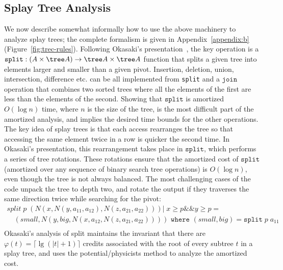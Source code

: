 \subsection{Splay Tree Analysis}
We now describe somewhat informally how to use the above machinery to
analyze splay trees; the complete formalism is given 
in Appendix~\ref{appendix:b} (Figure~\ref{fig:trec-rules}).%
Following 
Okasaki's presentation~\cite{okasaki:purely-functional-data-structures},
the key operation is
a $\texttt{split} : (A \times \tree A) \to \tree A \times \tree A$ function that splits a given tree into elements larger and smaller than a given pivot. Insertion, deletion, union, intersection, difference etc. can be all implemented from \texttt{split} and a $\texttt{join}$ operation that combines two sorted trees where all the elements of the first are less than the elements of the second. Showing that $\texttt{split}$ is amortized $O(\log n)$ time, where $n$ is the size of the tree, is the most difficult part of the amortized analysis, and implies the desired time bounds for the other operations.  The key idea of splay trees is that each access rearranges the tree so that accessing the same element twice in a row is quicker the second time. In Okasaki's presentation, this rearrangement takes place in $\texttt{split}$, which performs a series of tree rotations. These rotations ensure that the amortized cost of $\texttt{split}$ (amortized over any sequence of binary search tree operations) is $O(\log n)$, even though the tree is not always balanced.
The most challenging cases of the code unpack the tree to depth two, and rotate the output if they traverses the same direction twice while searching for the pivot:
$$
\begin{array}{l}
split \; p \; (N (x,N (y,a_{11},a_{12}), N (z,a_{21},a_{22}))) | \; x \geq p \mathbin{\&\&} y \geq p = \\
\hspace{1em} (small, N (y,big,N (x,a_{12},N (z,a_{21},a_{22})))) \texttt{ where } (small,big) = \texttt{split} \; p \; a_{11}\\
\end{array}
$$
Okasaki's analysis of split maintains the invariant that there are $\varphi(t) = \lceil{\lg (|t| + 1)}\rceil$ credits associated with the root of every subtree $t$ in a splay tree, and uses the potential/physicists method to analyze the amortized cost.  

